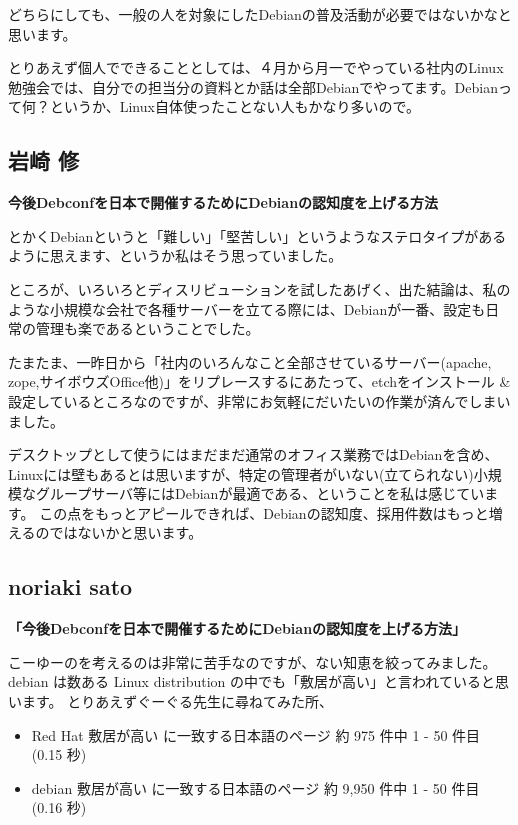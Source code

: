 \documentclass[mingoth,a4paper]{jsarticle}
\begin{document}
どちらにしても、一般の人を対象にしたDebianの普及活動が必要ではないかなと思います。

とりあえず個人でできることとしては、４月から月一でやっている社内のLinux勉強会では、自分での担当分の資料とか話は全部Debianでやってます。Debianって何？というか、Linux自体使ったことない人もかなり多いので。

\subsection{岩崎 修}

\textbf{今後Debconfを日本で開催するためにDebianの認知度を上げる方法}

とかくDebianというと「難しい」「堅苦しい」というようなステロタイプがあるように思えます、というか私はそう思っていました。

ところが、いろいろとディスリビューションを試したあげく、出た結論は、私のような小規模な会社で各種サーバーを立てる際には、Debianが一番、設定も日常の管理も楽であるということでした。

たまたま、一昨日から「社内のいろんなこと全部させているサーバー(apache,
zope,サイボウズOffice他)」をリプレースするにあたって、etchをインストール
\& 設定しているところなのですが、非常にお気軽にだいたいの作業が済んでしまい
ました。

デスクトップとして使うにはまだまだ通常のオフィス業務ではDebianを含め、Linuxには壁もあるとは思いますが、特定の管理者がいない(立てられない)小規模なグループサーバ等にはDebianが最適である、ということを私は感じています。
この点をもっとアピールできれば、Debianの認知度、採用件数はもっと増えるのではないかと思います。


\subsection{noriaki sato }

\textbf{「今後Debconfを日本で開催するためにDebianの認知度を上げる方法」}

こーゆーのを考えるのは非常に苦手なのですが、ない知恵を絞ってみました。
debian は数ある Linux distribution の中でも「敷居が高い」と言われていると思います。
とりあえずぐーぐる先生に尋ねてみた所、

\begin{itemize}
 \item  Red Hat 敷居が高い  に一致する日本語のページ 約 975 件中 1 - 50 件目 (0.15 秒) 
 \item  debian 敷居が高い に一致する日本語のページ 約 9,950 件中 1 - 50 件目 (0.16 秒) 
\end{itemize}
\end{document}
